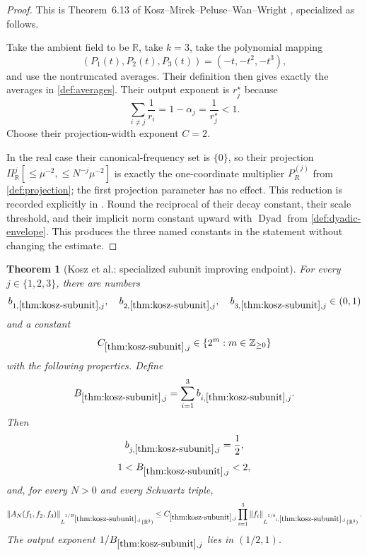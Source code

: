 \documentclass[11pt]{article}
\newtheorem{theorem}{Theorem}[section]
\newcommand{\R}{\mathbb{R}}
\newcommand{\Dyad}{\operatorname{Dyad}}
\newcommand{\norm}[2]{\left\lVert #1\right\rVert_{#2}}
\newcommand{\Cst}[2]{C_{\ref{#1},#2}}
\newcommand{\set}[1]{\left\{#1\right\}}
\newcommand{\indices}{\{1,2,3\}}
\begin{document}
\begin{proof}
This is Theorem~6.13 of Kosz--Mirek--Peluse--Wan--Wright \cite[Theorem~6.13]{KoszEtAl}, specialized as follows.

Take the ambient field to be \(\R\), take \(k=3\), take the polynomial mapping
\[
(P_1(t),P_2(t),P_3(t))=(-t,-t^2,-t^3),
\]
and use the nontruncated averages.  Their definition then gives exactly the averages in \cref{def:averages}.  Their output exponent is \(r_j^\star\) because
\[
\sum_{i\neq j}\frac1{r_i}=1-\alpha_j=\frac1{r_j^\star}<1.
\]
Choose their projection-width exponent \(C=2\).

In the real case their canonical-frequency set is \(\{0\}\), so their projection \(\Pi_\R^j[\leq\mu^{-2},\leq N^{-j}\mu^{-2}]\) is exactly the one-coordinate multiplier \(P_R^{(j)}\) from \cref{def:projection}; the first projection parameter has no effect.  This reduction is recorded explicitly in \cite[Remark~6.9(i)]{KoszEtAl}.  Round the reciprocal of their decay constant, their scale threshold, and their implicit norm constant upward with \(\Dyad\) from \cref{def:dyadic-envelope}.  This produces the three named constants in the statement without changing the estimate.
\end{proof}

\begin{theorem}[Kosz et al.: specialized subunit improving endpoint]\label{thm:kosz-subunit}
For every \(j\in\indices\), there are numbers
\[
b_{1,\ref{thm:kosz-subunit},j},
\quad
b_{2,\ref{thm:kosz-subunit},j},
\quad
b_{3,\ref{thm:kosz-subunit},j}
\in(0,1)
\]
and a constant
\[
\Cst{thm:kosz-subunit}{j}\in\set{2^m:m\in\mathbb Z_{\geq0}}
\]
with the following properties.  Define
\[
B_{\ref{thm:kosz-subunit},j}
=
\sum_{i=1}^{3}b_{i,\ref{thm:kosz-subunit},j}.
\]
Then
\[
b_{j,\ref{thm:kosz-subunit},j}=\frac12,
\]
\[
1<B_{\ref{thm:kosz-subunit},j}<2,
\]
and, for every \(N>0\) and every Schwartz triple,
\[
\norm{A_N(f_1,f_2,f_3)}{L^{1/B_{\ref{thm:kosz-subunit},j}}(\R^3)}
\leq
\Cst{thm:kosz-subunit}{j}
\prod_{i=1}^{3}
\norm{f_i}{L^{1/b_{i,\ref{thm:kosz-subunit},j}}(\R^3)}.
\]
The output exponent \(1/B_{\ref{thm:kosz-subunit},j}\) lies in \((1/2,1)\).
\end{theorem}
\end{document}
